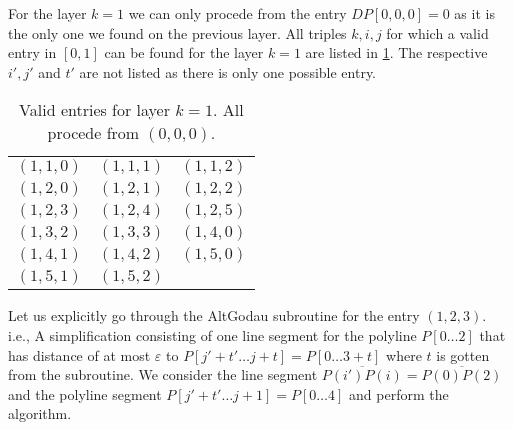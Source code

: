 For the layer \(k = 1\) we can only procede from the entry \(DP[0,0,0] = 0\) as it is the only one we found on the previous layer. All triples \(k, i, j\) for which a valid entry in \([0, 1]\) can be found for the layer \(k = 1\) are listed in \cref{tab:exlayer1}. The respective \(i', j'\) and \(t'\) are not listed as there is only one possible entry.
\begin{table}[ht]
\centering
\begin{tabular}{|ccc|}
\hline
$(1,1,0)$ & $(1,1,1)$ & $(1,1,2)$ \\
$(1,2,0)$ & $(1,2,1)$ & $(1,2,2)$ \\
$(1,2,3)$ & $(1,2,4)$ & $(1,2,5)$ \\
$(1,3,2)$ & $(1,3,3)$ & $(1,4,0)$ \\
$(1,4,1)$ & $(1,4,2)$ & $(1,5,0)$ \\
$(1,5,1)$ & $(1,5,2)$ & \\
\hline
\end{tabular}
\caption{Valid entries for layer \(k = 1\). All procede from \((0,0,0)\).}
\label{tab:exlayer1}
\end{table}

Let us explicitly go through the AltGodau subroutine for the entry \((1, 2, 3)\). i.e., A simplification consisting of one line segment for the polyline \(P[0\dots 2]\) that has distance of at most \(\varepsilon\) to \(P[j' + t'\dots j + t] = P[0 \dots 3 + t]\) where \(t\) is gotten from the subroutine. We consider the line segment \(\overline{P(i')P(i)} = \overline{P(0)P(2)}\) and the polyline segment \(P[j' + t' \dots j + 1] = P[0 \dots 4]\) and perform the algorithm. 

